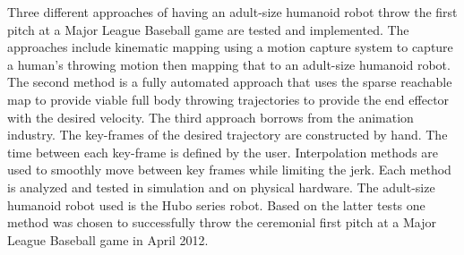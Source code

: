 Three different approaches of having an adult-size humanoid robot throw the first pitch at a Major League Baseball game are tested and implemented.  
The approaches include kinematic mapping using a motion capture system to capture a human's throwing motion then mapping that to an adult-size humanoid robot.  
The second method is a fully automated approach that uses the sparse reachable map to provide viable full body throwing trajectories to provide the end effector with the desired velocity.  
The third approach borrows from the animation industry.  
The key-frames of the desired trajectory are constructed by hand.  
The time between each key-frame is defined by the user.  
Interpolation methods are used to smoothly move between key frames while limiting the jerk.  
Each method is analyzed and tested in simulation and on physical hardware.  
The adult-size humanoid robot used is the Hubo series robot.  
Based on the latter tests one method was chosen to successfully throw the ceremonial first pitch at a Major League Baseball game in April 2012.